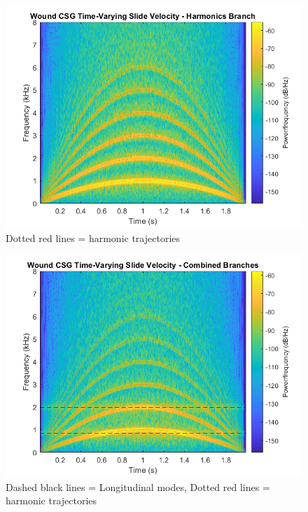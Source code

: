 \documentclass[../main.tex]{subfiles}
\begin{document}
\begin{figure}[h]
    \centering
    \includegraphics[scale=.65]{./images/plots/CSG_Wound_TV_Harm.png}
    \caption{Dotted red lines = harmonic trajectories}
    \label{fig:CSGWoundTVHarm}
\end{figure}

\begin{figure}[h]
    \centering
    \includegraphics[scale=.65]{./images/plots/CSG_Wound_TV_Both.png}
    \caption{Dashed black lines = Longitudinal modes, Dotted red lines = harmonic trajectories}
    \label{fig:CSGWoundTVBoth}
\end{figure}

\clearpage
\end{document}
